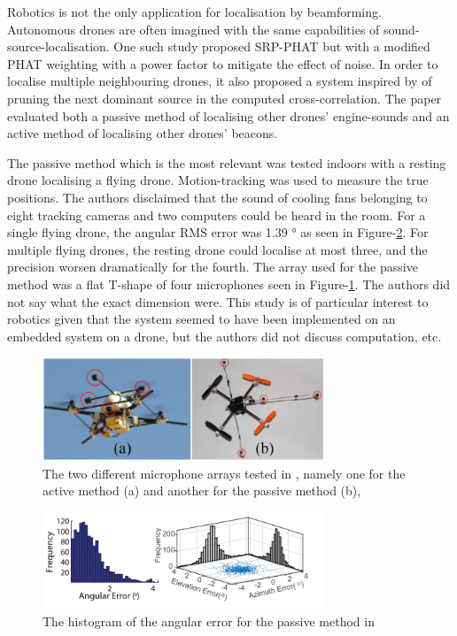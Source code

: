 \documentclass[notitlepage]{report}
\begin{document}
Robotics is not the only application for localisation by beamforming. Autonomous drones are often imagined with the same capabilities of sound-source-localisation. One such study \cite{basiri_-board_2016} proposed SRP-PHAT but with a modified PHAT weighting with a power factor to mitigate the effect of noise. In order to localise multiple neighbouring drones, it also proposed a system inspired by \cite{brutti_multiple_2010} of pruning the next dominant source in the computed cross-correlation. The paper evaluated both a passive method of localising other drones' engine-sounds and an active method of localising other drones' beacons. 

The passive method which is the most relevant was tested indoors with a resting drone localising a flying drone. Motion-tracking was used to measure the true positions. The authors disclaimed that the sound of cooling fans belonging to eight tracking cameras and two computers could be heard in the room. For a single flying drone, the angular RMS error was 1.39 \si{\degree} as seen in Figure-\ref{fig:basiri_2016_histogram}. For multiple flying drones, the resting drone could localise at most three, and the precision worsen dramatically for the fourth. The array used for the passive method was a flat T-shape of four microphones seen in Figure-\ref{fig:basiri_2016_array}. The authors did not say what the exact dimension were. This study is of particular interest to robotics given that the system seemed to have been implemented on an embedded system on a drone, but the authors did not discuss computation, etc.

\begin{figure}[H]
\includegraphics[width=0.75\textwidth]{./basiri_2016/array.png}
\centering
\caption{The two different microphone arrays tested in \cite{basiri_-board_2016}, namely one for the active method (a) and another for the passive method (b),}
\label{fig:basiri_2016_array}
\centering
\end{figure}

\begin{figure}[H]
\includegraphics[width=0.75\textwidth]{./basiri_2016/histogram.png}
\centering
\caption{The histogram of the angular error for the passive method in \cite{basiri_-board_2016}}
\label{fig:basiri_2016_histogram}
\centering
\end{figure}
\end{document}
